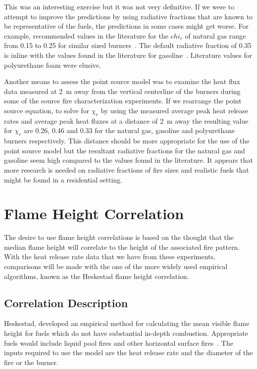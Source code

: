 \documentclass[twoside]{uocthesis}
\begin{document}
{This was an interesting exercise but it was not very definitive.  If we were to attempt to improve the predictions by using radiative fractions that are known to be representative of the fuels, the predictions in some cases might get worse.  For example, recommended values in the literature for the $chi_r$ of natural gas range from 0.15 to 0.25 for similar sized burners~\cite{Hostikka:3,McCaffrey:1982}.  The default radiative fraction of 0.35 is inline with the values found in the literature for gasoline~\cite{Hamins:1991,McGrattan:2000}.  Literature values for polyurethane foam were elusive. 

Another means to assess the point source model was to examine the heat flux data measured at 2~m away from the vertical centerline of the burners during some of the source fire characterization experiments. If we rearrange the point source equation, to solve for $\chi_r$ by using the measured average peak heat release rates and average peak heat fluxes at a distance of 2~m away the resulting value for $\chi_r$ are 0.26, 0.46 and 0.33 for the natural gas, gasoline and polyurethane burners respectively.  This distance should be more appropriate for the use of the point source model but the resultant radiative fractions for the natural gas and gasoline seem high compared to the values found in the literature.  It appears that more research is needed on radiative fractions of fire sizes and realistic fuels that might be found in a residential setting.

\section{Flame Height Correlation}

The desire to use flame height correlations is based on the thought that the median flame height will correlate to the height of the associated fire pattern.  With the heat release rate data that we have from these experiments, comparisons will be made with the one of the more widely used empirical algorithms, known as the Heskestad flame height correlation.  

\subsection{Correlation Description}

Heskestad, developed an empirical method for calculating the mean visible flame height for fuels which do not have substantial in-depth combustion.  Appropriate fuels would include liquid pool fires and other horizontal surface fires~\cite{Heskestad:SFPE,Beyler:1986}. The inputs required to use the model are the heat release rate and the diameter of the fire or the burner.

}
\end{document}
